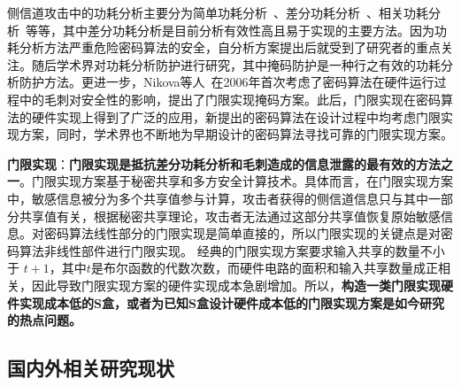 \documentclass[a4paper,zihao=-4,AutoFakeBold]{ctexart}
\begin{document}



侧信道攻击中的功耗分析主要分为简单功耗分析~\cite{KocherDPA99}、差分功耗分析~\cite{KocherDPA99}、相关功耗分析~\cite{CPA04}等等，其中差分功耗分析是目前分析有效性高且易于实现的主要方法。因为功耗分析方法严重危险密码算法的安全，自分析方案提出后就受到了研究者的重点关注。随后学术界对功耗分析防护进行研究，其中掩码防护是一种行之有效的功耗分析防护方法。更进一步，Nikova等人~\cite{Nikova06TI}在2006年首次考虑了密码算法在硬件运行过程中的毛刺对安全性的影响，提出了门限实现掩码方案。此后，门限实现在密码算法的硬件实现上得到了广泛的应用，新提出的密码算法在设计过程中均考虑门限实现方案，同时，学术界也不断地为早期设计的密码算法寻找可靠的门限实现方案。

\textbf{门限实现}：\textbf{门限实现是抵抗差分功耗分析和毛刺造成的信息泄露的最有效的方法之一}。门限实现方案基于秘密共享和多方安全计算技术。具体而言，在门限实现方案中，敏感信息被分为多个共享值参与计算，攻击者获得的侧信道信息只与其中一部分共享值有关，根据秘密共享理论，攻击者无法通过这部分共享值恢复原始敏感信息。对密码算法线性部分的门限实现是简单直接的，所以门限实现的关键点是对密码算法非线性部件进行门限实现。
经典的门限实现方案要求输入共享的数量不小于 $t+1$，其中$t$是布尔函数的代数次数，而硬件电路的面积和输入共享数量成正相关，因此导致门限实现方案的硬件实现成本急剧增加。所以，\textbf{构造一类门限实现硬件实现成本低的S盒，或者为已知S盒设计硬件成本低的门限实现方案是如今研究的热点问题。}


\subsection{国内外相关研究现状}
\end{document}

